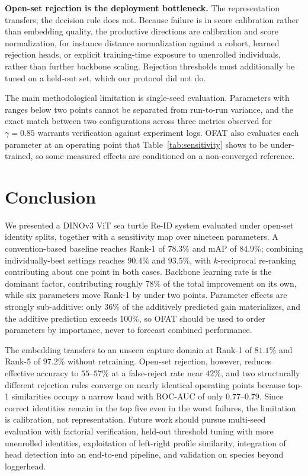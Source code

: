 \documentclass[conference]{IEEEtran}
\begin{document}
\textbf{Open-set rejection is the deployment bottleneck.} The representation transfers;
the decision rule does not. Because failure is in score calibration rather than
embedding quality, the productive directions are calibration and score normalization,
for instance distance normalization against a cohort, learned rejection heads, or
explicit training-time exposure to unenrolled individuals, rather than further backbone
scaling. Rejection thresholds must additionally be tuned on a held-out set, which our
protocol did not do.

The main methodological limitation is single-seed evaluation. Parameters with ranges
below two points cannot be separated from run-to-run variance, and the exact match
between two configurations across three metrics observed for $\gamma=0.85$ warrants
verification against experiment logs. OFAT also evaluates each parameter at an operating
point that Table~\ref{tab:sensitivity} shows to be under-trained, so some measured
effects are conditioned on a non-converged reference.

\section{Conclusion}

We presented a DINOv3 ViT sea turtle Re-ID system evaluated under open-set identity
splits, together with a sensitivity map over nineteen parameters. A convention-based
baseline reaches Rank-1 of $78.3\%$ and mAP of $84.9\%$; combining individually-best
settings reaches $90.4\%$ and $93.5\%$, with $k$-reciprocal re-ranking contributing
about one point in both cases. Backbone learning rate is the dominant factor,
contributing roughly $78\%$ of the total improvement on its own, while six parameters
move Rank-1 by under two points. Parameter effects are strongly sub-additive: only
$36\%$ of the additively predicted gain materializes, and the additive prediction
exceeds $100\%$, so OFAT should be used to order parameters by importance, never to
forecast combined performance.

The embedding transfers to an unseen capture domain at Rank-1 of $81.1\%$ and Rank-5 of
$97.2\%$ without retraining. Open-set rejection, however, reduces effective accuracy to
$55$--$57\%$ at a false-reject rate near $42\%$, and two structurally different rejection
rules converge on nearly identical operating points because top-1 similarities occupy a
narrow band with ROC-AUC of only $0.77$--$0.79$. Since correct identities remain in the
top five even in the worst failures, the limitation is calibration, not representation.
Future work should pursue multi-seed evaluation with factorial verification, held-out
threshold tuning with more unenrolled identities, exploitation of left-right profile
similarity, integration of head detection into an end-to-end pipeline, and validation on
species beyond loggerhead.
\end{document}

